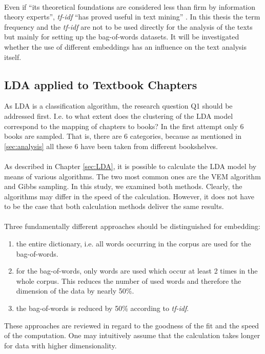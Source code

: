 \documentclass[11pt,a4paper]{article}
\begin{document}
\ \\
Even if “its theoretical foundations are considered less than firm by information theory experts”, \textit{tf-idf} “has proved useful in text mining” \cite{Silge2017}. In this thesis the term frequency and the \textit{tf-idf} are not to be used directly for the analysis of the texts but mainly for setting up the bag-of-words datasets. It will be investigated whether the use of different embeddings has an influence on the text analysis itself.

\subsection{LDA applied to Textbook Chapters} \label{Example1}

As LDA is a classification algorithm, the research question Q1 should be addressed first. I.e. to what extent does the clustering of the LDA model correspond to the mapping of chapters to books? In the first attempt only 6 books are sampled. That is, there are 6 categories, because as mentioned in \ref{sec:analysis} all these 6 have been taken from different bookshelves.\\
\ \\
As described in Chapter \ref{sec:LDA}, it is possible to calculate the LDA model by means of various algorithms. The two most common ones are the VEM algorithm and Gibbs sampling. In this study, we examined both methods. Clearly, the algorithms may differ in the speed of the calculation. However, it does not have to be the case that both calculation methods deliver the same results.\\
\ \\
Three fundamentally different approaches should be distinguished for embedding:
\begin{enumerate}
	\item the entire dictionary, i.e. all words occurring in the corpus are used for the bag-of-words.	
	\item for the bag-of-words, only words are used which occur at least 2 times in the whole corpus. This reduces the number of used words and therefore the dimension of the data by nearly 50\%.
	\item the bag-of-words is reduced by 50\% according to \textit{tf-idf}.
\end{enumerate}
These approaches are reviewed in regard to the goodness of the fit and the speed of the computation. One may intuitively assume that the calculation takes longer for data with higher dimensionality.\\
\end{document}
